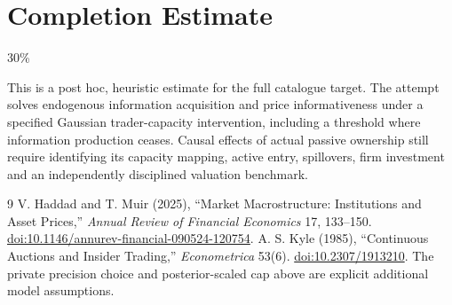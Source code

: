 \documentclass[11pt,a4paper]{article}
\theoremstyle{remark}
\begin{document}
\section{Completion Estimate}
30\%

This is a post hoc, heuristic estimate for the full catalogue target.
The attempt solves endogenous information acquisition and price informativeness under a specified Gaussian trader-capacity intervention, including a threshold where information production ceases. Causal effects of actual passive ownership still require identifying its capacity mapping, active entry, spillovers, firm investment and an independently disciplined valuation benchmark.

\begin{thebibliography}{9}
 V. Haddad and T. Muir (2025), ``Market Macrostructure: Institutions and Asset Prices,'' \emph{Annual Review of Financial Economics} 17, 133--150. \href{https://doi.org/10.1146/annurev-financial-090524-120754}{doi:10.1146/annurev-financial-090524-120754}.
 A. S. Kyle (1985), ``Continuous Auctions and Insider Trading,'' \emph{Econometrica} 53(6). \href{https://doi.org/10.2307/1913210}{doi:10.2307/1913210}. The private precision choice and posterior-scaled cap above are explicit additional model assumptions.
\end{thebibliography}
\end{document}
